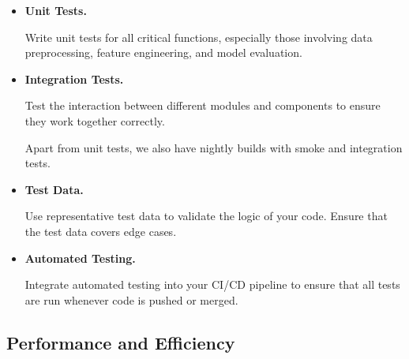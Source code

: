 \begin{itemize}
    \item \textbf{Unit Tests.}
    
    \noindent
    Write unit tests for all critical functions, especially those
    involving data preprocessing, feature engineering, and model
    evaluation.


    \item \textbf{Integration Tests.}
    
    \noindent
    Test the interaction between different modules and components
    to ensure they work together correctly.

    Apart from unit tests, we also have nightly builds with smoke
    and integration tests.

    \item \textbf{Test Data.}
    
    \noindent
    Use representative test data to validate the logic of your code.
    Ensure that the test data covers edge cases. 


    \item \textbf{Automated Testing.}
    
    \noindent
    Integrate automated testing into your CI/CD pipeline to ensure
    that all tests are run whenever code is pushed or merged.

\end{itemize}



\subsection{Performance and Efficiency}

